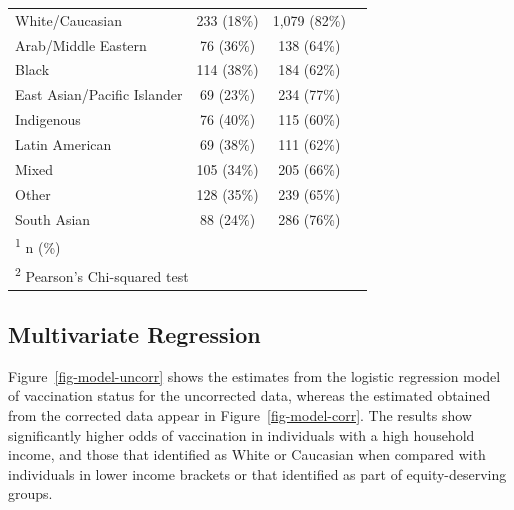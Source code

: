\documentclass[
  letterpaper,
  DIV=11,
  numbers=noendperiod]{scrartcl}
\begin{document}
\begin{table}
\begin{tabular}{lccc}
\hspace{1em}White/Caucasian & 233 (18\%) & 1,079 (82\%) & \\
\hspace{1em}Arab/Middle Eastern & 76 (36\%) & 138 (64\%) & \\
\hspace{1em}Black & 114 (38\%) & 184 (62\%) & \\
\hspace{1em}East Asian/Pacific Islander & 69 (23\%) & 234 (77\%) & \\
\hspace{1em}Indigenous & 76 (40\%) & 115 (60\%) & \\
\hspace{1em}Latin American & 69 (38\%) & 111 (62\%) & \\
\hspace{1em}Mixed & 105 (34\%) & 205 (66\%) & \\
\hspace{1em}Other & 128 (35\%) & 239 (65\%) & \\
\hspace{1em}South Asian & 88 (24\%) & 286 (76\%) & \\
\bottomrule
\multicolumn{4}{l}{\rule{0pt}{1em}\textsuperscript{1} n (\%)}\\
\multicolumn{4}{l}{\rule{0pt}{1em}\textsuperscript{2} Pearson's Chi-squared test}\\
\end{tabular}
\endgroup{}
\end{table}

\hypertarget{multivariate-regression}{%
\subsection{Multivariate Regression}\label{multivariate-regression}}

Figure~\ref{fig-model-uncorr} shows the estimates from the logistic
regression model of vaccination status for the uncorrected data, whereas
the estimated obtained from the corrected data appear in
Figure~\ref{fig-model-corr}. The results show significantly higher odds
of vaccination in individuals with a high household income, and those
that identified as White or Caucasian when compared with individuals in
lower income brackets or that identified as part of equity-deserving
groups.
\end{document}
